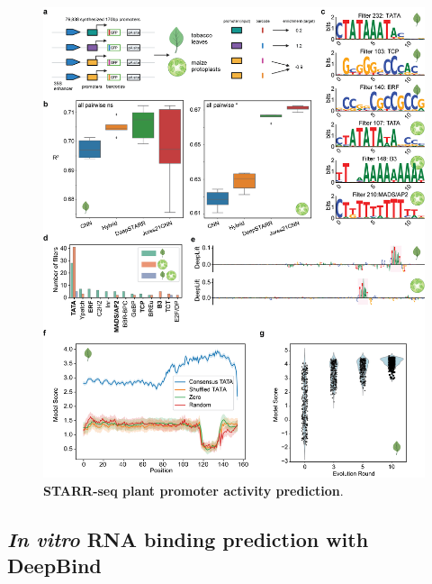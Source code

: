 \clearpage

\begin{figure}[!htbp]
    \centering
    \includegraphics[height=0.8\textheight, keepaspectratio]{1_figures-and-files/figure2.png}
    \caption[STARR-seq plant promoter activity prediction]{\textbf{STARR-seq plant promoter activity prediction}.}
    \label{fig:1 Figure 2}
\end{figure}

\clearpage


\subsection{\textit{In vitro} RNA binding prediction with DeepBind}

